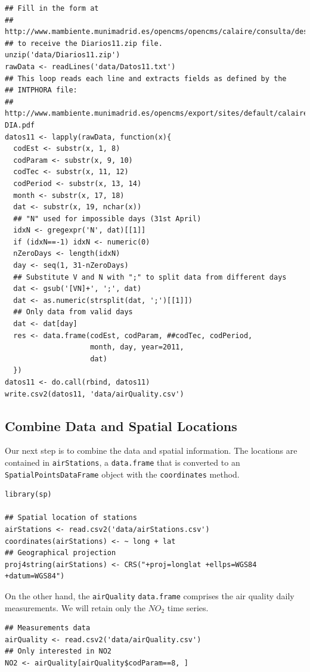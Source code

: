 \documentclass[smallroyalvopaper]{memoir}
\begin{document}
\lstset{language=R,numbers=none}
\begin{lstlisting}
## Fill in the form at
## http://www.mambiente.munimadrid.es/opencms/opencms/calaire/consulta/descarga.html
## to receive the Diarios11.zip file.
unzip('data/Diarios11.zip')
rawData <- readLines('data/Datos11.txt')
## This loop reads each line and extracts fields as defined by the
## INTPHORA file:
## http://www.mambiente.munimadrid.es/opencms/export/sites/default/calaire/Anexos/INTPHORA-DIA.pdf
datos11 <- lapply(rawData, function(x){
  codEst <- substr(x, 1, 8)
  codParam <- substr(x, 9, 10)
  codTec <- substr(x, 11, 12)
  codPeriod <- substr(x, 13, 14)
  month <- substr(x, 17, 18)
  dat <- substr(x, 19, nchar(x))
  ## "N" used for impossible days (31st April)
  idxN <- gregexpr('N', dat)[[1]]
  if (idxN==-1) idxN <- numeric(0)
  nZeroDays <- length(idxN)
  day <- seq(1, 31-nZeroDays)
  ## Substitute V and N with ";" to split data from different days
  dat <- gsub('[VN]+', ';', dat)
  dat <- as.numeric(strsplit(dat, ';')[[1]])
  ## Only data from valid days
  dat <- dat[day]
  res <- data.frame(codEst, codParam, ##codTec, codPeriod,
                    month, day, year=2011,
                    dat)
  })
datos11 <- do.call(rbind, datos11)
write.csv2(datos11, 'data/airQuality.csv')
\end{lstlisting}
\subsection{Combine Data and Spatial Locations}
\label{sec-1-2}
Our next step is to combine the data and spatial information. The
locations are contained in \texttt{airStations}, a \texttt{data.frame} that is
converted to an \texttt{SpatialPointsDataFrame} object with the \texttt{coordinates}
method.


\lstset{language=R,numbers=none}
\begin{lstlisting}
library(sp)

## Spatial location of stations
airStations <- read.csv2('data/airStations.csv')
coordinates(airStations) <- ~ long + lat
## Geographical projection
proj4string(airStations) <- CRS("+proj=longlat +ellps=WGS84 +datum=WGS84")
\end{lstlisting}

On the other hand, the \texttt{airQuality} \texttt{data.frame} comprises the air
quality daily measurements. We will retain only the $NO_2$ time
series.
\lstset{language=R,numbers=none}
\begin{lstlisting}
## Measurements data
airQuality <- read.csv2('data/airQuality.csv')
## Only interested in NO2 
NO2 <- airQuality[airQuality$codParam==8, ]
\end{lstlisting}
\end{document}
